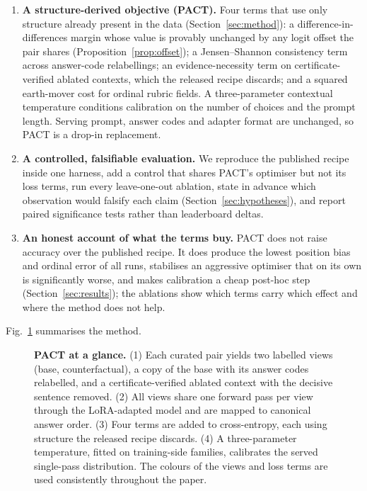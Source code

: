 \documentclass[conference]{IEEEtran}
\begin{document}
\begin{enumerate}
\item \textbf{A structure-derived objective (PACT).} Four terms that use only
  structure already present in the data (Section~\ref{sec:method}): a
  difference-in-differences margin whose value is provably unchanged by any
  logit offset the pair shares (Proposition~\ref{prop:offset}); a
  Jensen--Shannon consistency term across answer-code relabellings; an
  evidence-necessity term on certificate-verified ablated contexts, which the
  released recipe discards; and a squared earth-mover cost for ordinal rubric
  fields. A three-parameter contextual temperature conditions calibration on
  the number of choices and the prompt length. Serving prompt, answer codes
  and adapter format are unchanged, so PACT is a drop-in replacement.
\item \textbf{A controlled, falsifiable evaluation.} We reproduce the published
  recipe inside one harness, add a control that shares PACT's optimiser but
  not its loss terms, run every leave-one-out ablation, state in advance which
  observation would falsify each claim (Section~\ref{sec:hypotheses}), and report
  paired significance tests rather than leaderboard deltas.
\item \textbf{An honest account of what the terms buy.} PACT does not raise
  accuracy over the published recipe. It does produce the lowest position bias
  and ordinal error of all runs, stabilises an aggressive optimiser that on its
  own is significantly worse, and makes calibration a cheap post-hoc step
  (Section~\ref{sec:results}); the ablations show which terms carry which effect
  and where the method does not help.
\end{enumerate}

Fig.~\ref{fig:overview} summarises the method.

\begin{figure}[t]
\centering
\resizebox{\textwidth}{!}{%
}
\caption{\textbf{PACT at a glance.} (1) Each curated pair yields two labelled
views (base, counterfactual), a copy of the base with its answer codes
relabelled, and a certificate-verified ablated context with the decisive
sentence removed. (2) All views share one forward pass per view through the
LoRA-adapted model and are mapped to canonical answer order. (3) Four terms are
added to cross-entropy, each using structure the released recipe discards.
(4) A three-parameter temperature, fitted on training-side families, calibrates
the served single-pass distribution. The colours of the views and loss terms
are used consistently throughout the paper.}
\label{fig:overview}
\end{figure}
\end{document}
